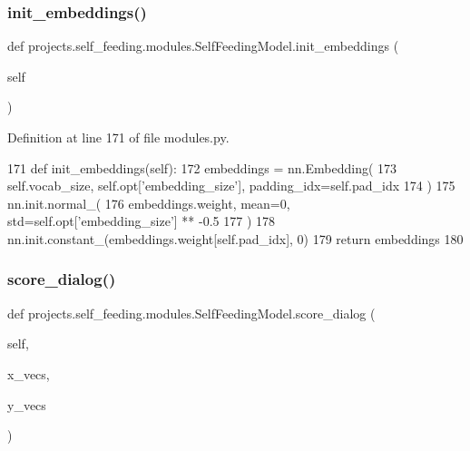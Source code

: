 \subsubsection{\texorpdfstring{init\+\_\+embeddings()}{init\_embeddings()}}
{\footnotesize\ttfamily def projects.\+self\+\_\+feeding.\+modules.\+Self\+Feeding\+Model.\+init\+\_\+embeddings (\begin{DoxyParamCaption}\item[{}]{self }\end{DoxyParamCaption})}



Definition at line 171 of file modules.\+py.


\begin{DoxyCode}
171     \textcolor{keyword}{def }init\_embeddings(self):
172         embeddings = nn.Embedding(
173             self.vocab\_size, self.opt[\textcolor{stringliteral}{'embedding\_size'}], padding\_idx=self.pad\_idx
174         )
175         nn.init.normal\_(
176             embeddings.weight, mean=0, std=self.opt[\textcolor{stringliteral}{'embedding\_size'}] ** -0.5
177         )
178         nn.init.constant\_(embeddings.weight[self.pad\_idx], 0)
179         \textcolor{keywordflow}{return} embeddings
180 
\end{DoxyCode}
\mbox{\label{classprojects_1_1self__feeding_1_1modules_1_1SelfFeedingModel_a6cd2fe02cf3a0e00413941b787406abe}} 
\subsubsection{\texorpdfstring{score\+\_\+dialog()}{score\_dialog()}}
{\footnotesize\ttfamily def projects.\+self\+\_\+feeding.\+modules.\+Self\+Feeding\+Model.\+score\+\_\+dialog (\begin{DoxyParamCaption}\item[{}]{self,  }\item[{}]{x\+\_\+vecs,  }\item[{}]{y\+\_\+vecs }\end{DoxyParamCaption})}



